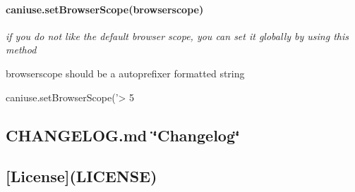 \paragraph*{{\ttfamily caniuse.\+set\+Browser\+Scope(browserscope)}}

{\itshape if you do not like the default browser scope, you can set it globally by using this method}


\begin{DoxyItemize}
\item browserscope should be a \textquotesingle{}autoprefixer\textquotesingle{} formatted string
\end{DoxyItemize}


\begin{DoxyCode}
caniuse.setBrowserScope('> 5%
\end{DoxyCode}






\subsection*{C\+H\+A\+N\+G\+E\+L\+O\+G.\+md \char`\"{}\+Changelog\char`\"{}}

\subsection*{\mbox{[}License\mbox{]}(L\+I\+C\+E\+N\+SE)}